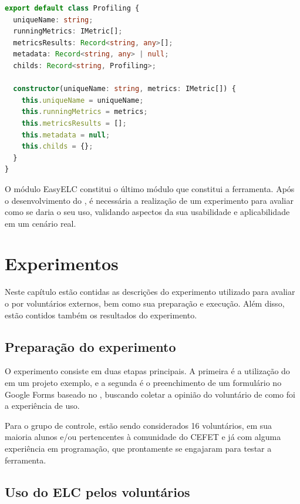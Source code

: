 \documentclass[12pt]{tcc}
\begin{document}
\begin{lstlisting}[label={lst:easyelc_profiling_class}, caption={Implementação do nó da árvore de análises usado no EasyElc.}, language=TypeScript, breaklines=true]
export default class Profiling {
  uniqueName: string;
  runningMetrics: IMetric[];
  metricsResults: Record<string, any>[];
  metadata: Record<string, any> | null;
  childs: Record<string, Profiling>;

  constructor(uniqueName: string, metrics: IMetric[]) {
    this.uniqueName = uniqueName;
    this.runningMetrics = metrics;
    this.metricsResults = [];
    this.metadata = null;
    this.childs = {};
  }
}
\end{lstlisting}

	O módulo EasyELC constitui o último módulo que constitui a ferramenta. Após o desenvolvimento do , é necessária a realização de um experimento para avaliar como se daria o seu uso, validando aspectos da sua usabilidade e aplicabilidade em um cenário real.

\chapter{Experimentos}
	\label{cap:experimentos}

	Neste capítulo estão contidas as descrições do experimento utilizado para avaliar o  por voluntários externos, bem como sua preparação e execução. Além disso, estão contidos também os resultados do experimento.

	\section{Preparação do experimento}
	\label{section:preparacao-experimento}

	O experimento consiste em duas etapas principais. A primeira é a utilização do  em um projeto exemplo, e a segunda é o preenchimento de um formulário no Google Forms baseado no , buscando coletar a opinião do voluntário de como foi a experiência de uso.

	Para o grupo de controle, estão sendo considerados 16 voluntários, em sua maioria alunos e/ou pertencentes à comunidade do CEFET e já com alguma experiência em programação, que prontamente se engajaram para testar a ferramenta. 


	\section{Uso do ELC pelos voluntários}
	\label{section:parte-1-experimento}
\end{document}
